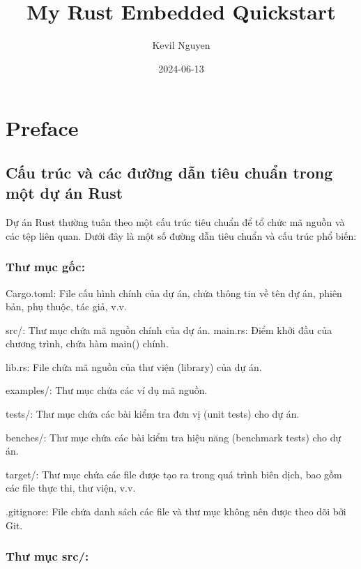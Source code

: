\documentclass[
  letterpaper,
  DIV=11,
  numbers=noendperiod]{scrreprt}
\title{My Rust Embedded Quickstart}
\author{Kevil Nguyen}
\date{2024-06-13}
\renewcommand*\contentsname{Table of contents}
\newcommand\contentsname{Table of contents}
\begin{document}
\maketitle

\renewcommand*\contentsname{Table of contents}
{
\hypersetup{linkcolor=}
\setcounter{tocdepth}{2}
\tableofcontents
}

\chapter{Preface}\label{preface}

\section{Cấu trúc và các đường dẫn tiêu chuẩn trong một dự án
Rust}\label{cux1ea5u-truxfac-vuxe0-cuxe1c-ux111ux1b0ux1eddng-dux1eabn-tiuxeau-chuux1ea9n-trong-mux1ed9t-dux1ef1-uxe1n-rust}

Dự án Rust thường tuân theo một cấu trúc tiêu chuẩn để tổ chức mã nguồn
và các tệp liên quan. Dưới đây là một số đường dẫn tiêu chuẩn và cấu
trúc phổ biến:

\subsection{Thư mục gốc:}\label{thux1b0-mux1ee5c-gux1ed1c}

Cargo.toml: File cấu hình chính của dự án, chứa thông tin về tên dự án,
phiên bản, phụ thuộc, tác giả, v.v.

src/: Thư mục chứa mã nguồn chính của dự án. main.rs: Điểm khởi đầu của
chương trình, chứa hàm main() chính.

lib.rs: File chứa mã nguồn của thư viện (library) của dự án.

examples/: Thư mục chứa các ví dụ mã nguồn.

tests/: Thư mục chứa các bài kiểm tra đơn vị (unit tests) cho dự án.

benches/: Thư mục chứa các bài kiểm tra hiệu năng (benchmark tests) cho
dự án.

target/: Thư mục chứa các file được tạo ra trong quá trình biên dịch,
bao gồm các file thực thi, thư viện, v.v.

.gitignore: File chứa danh sách các file và thư mục không nên được theo
dõi bởi Git.

\subsection{Thư mục src/:}\label{thux1b0-mux1ee5c-src}
\end{document}
